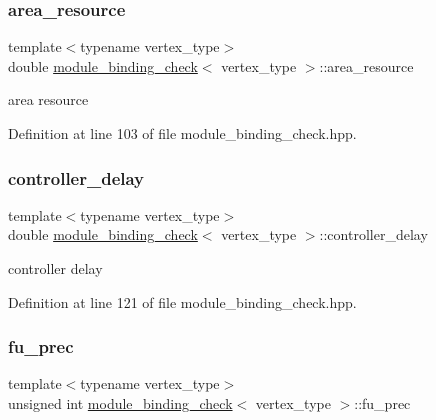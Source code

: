 \subsubsection{\texorpdfstring{area\+\_\+resource}{area\_resource}}
{\footnotesize\ttfamily template$<$typename vertex\+\_\+type$>$ \\
double \hyperlink{structmodule__binding__check}{module\+\_\+binding\+\_\+check}$<$ vertex\+\_\+type $>$\+::area\+\_\+resource\hspace{0.3cm}{\ttfamily [private]}}



area resource 



Definition at line 103 of file module\+\_\+binding\+\_\+check.\+hpp.

\mbox{\label{structmodule__binding__check_a3c463de0cce112e30192a1e10344fa74}} 
\subsubsection{\texorpdfstring{controller\+\_\+delay}{controller\_delay}}
{\footnotesize\ttfamily template$<$typename vertex\+\_\+type$>$ \\
double \hyperlink{structmodule__binding__check}{module\+\_\+binding\+\_\+check}$<$ vertex\+\_\+type $>$\+::controller\+\_\+delay\hspace{0.3cm}{\ttfamily [private]}}



controller delay 



Definition at line 121 of file module\+\_\+binding\+\_\+check.\+hpp.

\mbox{\label{structmodule__binding__check_a7560c2ec26af0c7bbbee514ff2814299}} 
\subsubsection{\texorpdfstring{fu\+\_\+prec}{fu\_prec}}
{\footnotesize\ttfamily template$<$typename vertex\+\_\+type$>$ \\
unsigned int \hyperlink{structmodule__binding__check}{module\+\_\+binding\+\_\+check}$<$ vertex\+\_\+type $>$\+::fu\+\_\+prec\hspace{0.3cm}{\ttfamily [private]}}



